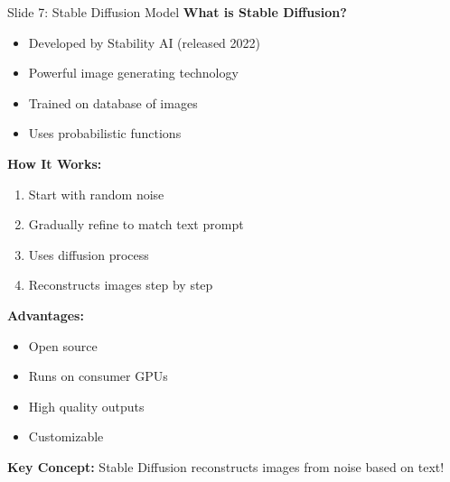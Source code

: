 \documentclass[8pt]{beamer}
\begin{document}
	\begin{frame}{Slide 7: Stable Diffusion Model}
		\fontsize{6.5}{7.5}\selectfont
		\textbf{What is Stable Diffusion?}
		\begin{itemize}
			\item Developed by Stability AI (released 2022)
			\item Powerful image generating technology
			\item Trained on database of images
			\item Uses probabilistic functions
		\end{itemize}
		
		\vspace{0.1cm}
		\textbf{How It Works:}
		\begin{enumerate}
			\item Start with random noise
			\item Gradually refine to match text prompt
			\item Uses diffusion process
			\item Reconstructs images step by step
		\end{enumerate}
		
		\vspace{0.1cm}
		\textbf{Advantages:}
		\begin{itemize}
			\item Open source
			\item Runs on consumer GPUs
			\item High quality outputs
			\item Customizable
		\end{itemize}
		
		\textcolor{myblue}{\textbf{Key Concept:}} Stable Diffusion reconstructs images from noise based on text!
	\end{frame}
	
\end{document}
